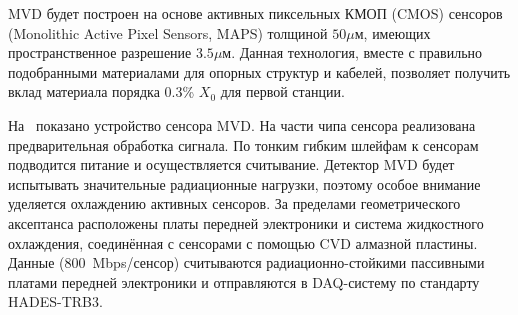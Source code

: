 MVD будет построен на основе активных пиксельных КМОП (CMOS) сенсоров (Monolithic Active Pixel Sensors, MAPS) толщиной $50 \mu$м, имеющих пространственное разрешение $3.5 \mu$м. Данная технология, вместе с правильно подобранными материалами для опорных структур и кабелей, позволяет получить вклад материала порядка 0.3\% $X_{0}$ для первой станции.




На~ показано устройство сенсора MVD.
На части чипа сенсора реализована предварительная обработка сигнала.
По тонким гибким шлейфам к сенсорам подводится питание и осуществляется считывание.
Детектор MVD будет испытывать значительные радиационные нагрузки, поэтому особое внимание уделяется охлаждению активных сенсоров. 
За пределами геометрического аксептанса расположены платы передней электроники и система жидкостного охлаждения, соединённая с сенсорами с помощью CVD алмазной пластины. \todo 
Данные (800~Mbps/сенсор) считываются радиационно-стойкими пассивными платами передней электроники и отправляются в DAQ-систему по стандарту HADES-TRB3.

